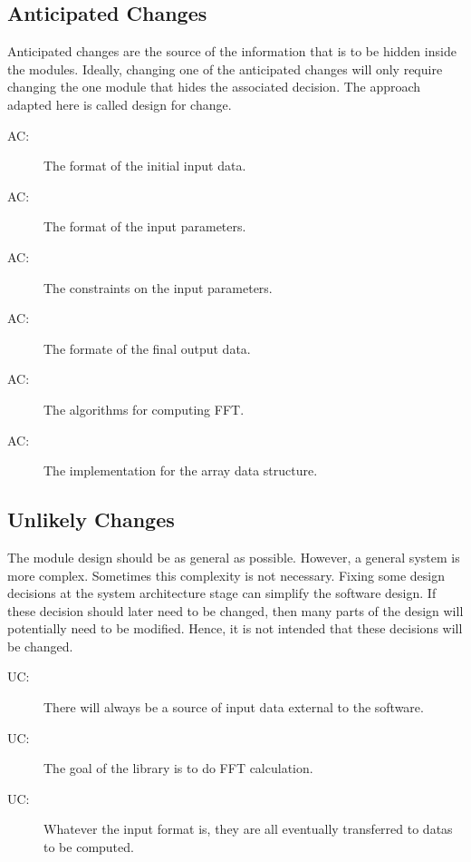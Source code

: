 \documentclass[12pt, titlepage]{article}
\newcounter{acnum}
\newcommand{\actheacnum}{AC\theacnum}
\newcounter{ucnum}
\newcommand{\uctheucnum}{UC\theucnum}
\begin{document}
\subsection{Anticipated Changes} \label{SecAchange}

Anticipated changes are the source of the information that is to be hidden
inside the modules. Ideally, changing one of the anticipated changes will only
require changing the one module that hides the associated decision. The approach
adapted here is called design for
change.

\begin{description}
\item[ \actheacnum \label{acInput}:] The format of the initial input data.
\item[ \actheacnum \label{acInputPara}:] The format of the input parameters.
\item[ \actheacnum \label{acInputcons}:] The constraints on the input parameters.
\item[ \actheacnum \label{acOutput}:] The formate of the final output data.
\item[ \actheacnum \label{acAlgorithm}:] The algorithms for computing FFT.
\item[ \actheacnum \label{acDataStructure}:] The implementation for the array data structure.
\end{description}

\subsection{Unlikely Changes} \label{SecUchange}

The module design should be as general as possible. However, a general system is
more complex. Sometimes this complexity is not necessary. Fixing some design
decisions at the system architecture stage can simplify the software design. If
these decision should later need to be changed, then many parts of the design
will potentially need to be modified. Hence, it is not intended that these
decisions will be changed.

\begin{description}
\item[ \uctheucnum \label{ucInput}:] There will always be
  a source of input data external to the software.
\item[ \uctheucnum \label{ucGoal}:] The goal of the library is to do FFT calculation. 
\item[ \uctheucnum \label{ucInputFormat}:] Whatever the
  input format is, they are all eventually transferred to datas to be
  computed. 
\end{description}
\end{document}
